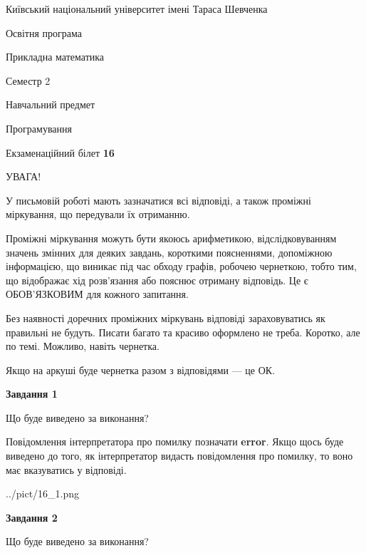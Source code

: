 \documentclass[12pt, ukrainian]{article}
\begin{document}
{{\begin {small}\par
{ \center  Київський національний університет імені Тараса Шевченка \par}
{\parbox {5 cm}{Освітня програма \hfill}{\parbox {7 cm}{Прикладна математика \hfill}}\parbox {6 cm}{\hfill Семестр 2}}\par
{\parbox {5 cm} {Навчальний предмет \hfill}\parbox {7 cm}{Програмування \hfill}\parbox {6cm}{\hfill}\par}\vspace{-7pt} \end{small}}{\center Екзаменаційний білет \No \textbf
{ 16 }\par}}
{
\begin {large}
УВАГА!

У письмовій роботі мають зазначатися всі відповіді, а також проміжні міркування, що передували їх отриманню.

Проміжні міркування можуть бути якоюсь арифметикою, відслідковуванням зна\-чень змінних для деяких завдань,
короткими поясненнями, допоміжною інформацією, що виникає під час обходу графів, робочею чернеткою,
тобто тим, що відображає хід розв’язання або пояснює отриману відповідь.
Це є ОБОВ’ЯЗКОВИМ для кожного запитання.

Без наявності доречних проміжних міркувань відповіді зараховуватись як правиль\-ні не будуть.
Писати багато та красиво оформлено не треба. Коротко, але по темі. Можли\-во, навіть чернетка.

Якщо на аркуші буде чернетка разом з відповідями --- це ОК.

\newpage

{\begin {center}\textbf{Завдання 1}\end {center}}\par
Що буде виведено за виконання?

Повідомлення інтерпретатора про помилку позначати \textbf{error}.
Якщо щось буде виведено до того, як інтерпретатор видасть повідомлення про помилку, 
то воно має вказуватись у відповіді. \par


\begin{center}
	{../pict/16_1.png}
\end{center}
\newpage

{\begin {center}\textbf{Завдання 2}\end {center}}\par
Що буде виведено за виконання?


\end{large}}
\end{document}
